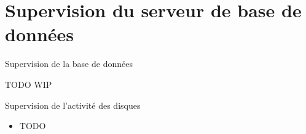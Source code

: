 
\section{Supervision du serveur de base de données}


\begin{frame}[fragile]{Supervision de la base de données}

   TODO
   WIP

\begin{toile}
\end{toile}

\end{frame}


\begin{frame}{Supervision de l'activité des disques}

\begin{itemize}

   \item TODO

\end{itemize}

\begin{toile}
\end{toile}

\end{frame}



